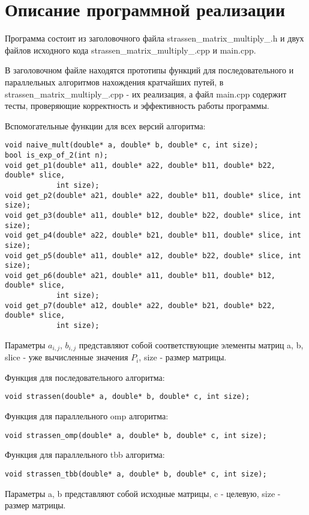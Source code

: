 \documentclass{report}
\begin{document}
\section*{Описание программной реализации}
Программа состоит из заголовочного файла strassen\_matrix\_multiply\_<используемая технология>.h и двух файлов исходного кода strassen\_matrix\_multiply\_<используемая технология>.cpp и main.cpp.
\par В заголовочном файле находятся прототипы функций для последовательного и параллельных алгоритмов нахождения кратчайших путей, в strassen\_matrix\_multiply\_<используемая технология>.cpp - их реализация, а файл main.cpp содержит тесты, проверяющие корректность и эффективность работы программы.
\par Вспомогательные функции для всех версий алгоритма:
\begin{lstlisting}
void naive_mult(double* a, double* b, double* c, int size);
bool is_exp_of_2(int n);
void get_p1(double* a11, double* a22, double* b11, double* b22, double* slice,
            int size);
void get_p2(double* a21, double* a22, double* b11, double* slice, int size);
void get_p3(double* a11, double* b12, double* b22, double* slice, int size);
void get_p4(double* a22, double* b21, double* b11, double* slice, int size);
void get_p5(double* a11, double* a12, double* b22, double* slice, int size);
void get_p6(double* a21, double* a11, double* b11, double* b12, double* slice,
            int size);
void get_p7(double* a12, double* a22, double* b21, double* b22, double* slice,
            int size);
\end{lstlisting}
\par Параметры $a_{i,j}$, $b_{i,j}$ представляют собой соответствующие элементы матриц a, b, slice - уже вычисленные значения $P_i$, size - размер матрицы.
\par Функция для последовательного алгоритма:
\begin{lstlisting}
void strassen(double* a, double* b, double* c, int size);
\end{lstlisting}
\par Функция для параллельного omp алгоритма:
\begin{lstlisting}
void strassen_omp(double* a, double* b, double* c, int size);
\end{lstlisting}
\par Функция для параллельного tbb алгоритма:
\begin{lstlisting}
void strassen_tbb(double* a, double* b, double* c, int size);
\end{lstlisting}
\par Параметры a, b представляют собой исходные матрицы, c - целевую, size - размер матрицы.
\end{document}
